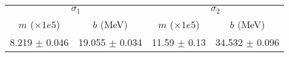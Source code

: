 \begin{tabular}{cc|cc}
\multicolumn{2}{c|}{$\sigma_1$} & \multicolumn{2}{|c}{$\sigma_2$} \\
$m$ ($\times1e5$) & $b$ (MeV) & $m$ ($\times1e5$) & $b$ (MeV) \\
\hline
8.219 $\pm$ 0.046 & 19.055 $\pm$ 0.034 & 11.59 $\pm$ 0.13 & 34.532 $\pm$ 0.096\\
\end{tabular}
